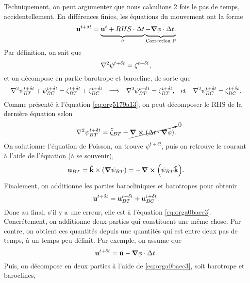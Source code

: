 \documentclass[10pt]{article}
\numberwithin{equation}{section}
\newcommand{\kvf}{\vb{\hat{k}}}
\newcommand{\uu}{\vb{u}}
\newcommand{\tall}{\vphantom{pA^{x^x}_p}}
\newcommand{\pt}{\hspace{1pt}} %
\begin{document}
Techniquement, on peut argumenter que nous calculions 2 fois le pas de temps, accidentellement.
En différences finies, les équations du mouvement ont la forme
\begin{equation}
\label{eq:org5179a13}
   \uu^{t+\delta t} =
   \underbrace{\uu^t + RHS\cdot \Delta t\tall}_{\tilde{u}}
   \underbrace{- \gradient{\phi}\cdot \Delta t.\tall}_\text{Correction P}
\end{equation}
Par définition, on sait que
\begin{equation}
   \laplacian{\psi^{t+\delta t}} = \zeta^{t+\delta t},
\end{equation}
et on décompose en partie barotrope et barocline, de sorte que
\begin{align}
   && \laplacian{\psi^{t+\delta t}_{BT} + \psi^{t+\delta t}_{BC}} = \zeta^{t+\delta t}_{BT} + \zeta^{t+\delta t}_{BC}
   && \Longrightarrow
   && \laplacian{\psi^{t+\delta t}}_{BT} = \zeta^{t+\delta t}_{BT},
   && \text{et}
   && \laplacian{\psi^{t+\delta t}}_{BC} = \zeta^{t+\delta t}_{BC}.&&
\end{align}
Comme présenté à l'équation \ref{eq:org5179a13}, on peut décomposer le RHS de la dernière équation selon
\begin{align}
   \laplacian{\psi^{t+\delta t}}_{BT} = \tilde{\zeta}_{BT} - \cancelto{0}{\curl(\Delta t\cdot\gradient{\phi})}.
\end{align}
On solutionne l'équation de Poisson, on trouve \(\psi^{t+\delta t}\), puis on retrouve le courant à l'aide de l'équation (à se souvenir), 
\begin{equation}
   \uu_{BT} = \kvf \times \qty(\gradient{\psi_{BT}}) = - \pt\curl(\psi_{BT}\kvf).
\end{equation}
Finalement, on additionne les parties barocliniques et barotropes pour obtenir
\begin{equation}
\label{eq:orga0baec3}
   \uu^{t+\delta t} = \uu_{BT}^{t+\delta t} + \uu_{BC}^{t+\delta t}.
\end{equation}
Donc au final, s'il y a une erreur, elle est à l'équation \ref{eq:orga0baec3}.
Concrétement, on additionne deux parties qui constituent une même chose.
Par contre, on obtient ces quantités depuis une quantités qui est entre deux pas de temps, à un temps peu définit.
Par exemple, on assume que
\begin{equation}
   \uu^{t+\delta t} = \tilde{\uu} - \gradient{\phi} \cdot \Delta t.
\end{equation}
Puis, on décompose en deux parties à l'aide de \ref{eq:orga0baec3}, soit barotrope et baroclines,
\end{document}
